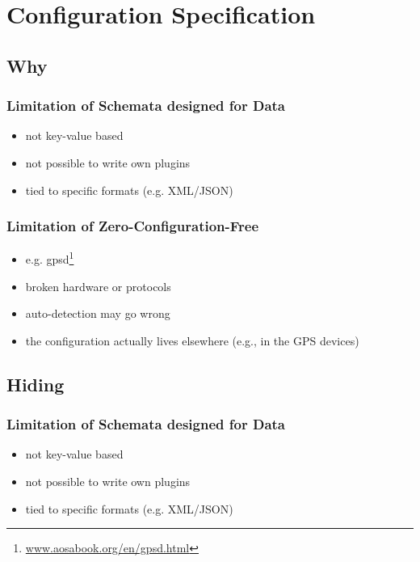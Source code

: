 \section{Configuration Specification}

\subsection{Why}

\begin{frame}
	\methodQuestion{}
\end{frame}

\begin{frame}
	\frametitle{Limitation of Schemata designed for Data}
	\begin{itemize}
	\item not key-value based
	\item not possible to write own plugins
	\item tied to specific formats (e.g. XML/JSON)
	\end{itemize}
\end{frame}

\begin{frame}
	\frametitle{Limitation of Zero-Configuration-Free}
	\begin{itemize}
	\item e.g. gpsd\footnote{\url{www.aosabook.org/en/gpsd.html}}
	\item broken hardware or protocols
	\item auto-detection may go wrong
	\item the configuration actually lives elsewhere (e.g., in the GPS devices)
	\end{itemize}
\end{frame}

\subsection{Hiding}

\begin{frame}
	\frametitle{Limitation of Schemata designed for Data}
	\methodQuestion{}
	\begin{itemize}
	\item not key-value based
	\item not possible to write own plugins
	\item tied to specific formats (e.g. XML/JSON)
	\end{itemize}
\end{frame}

